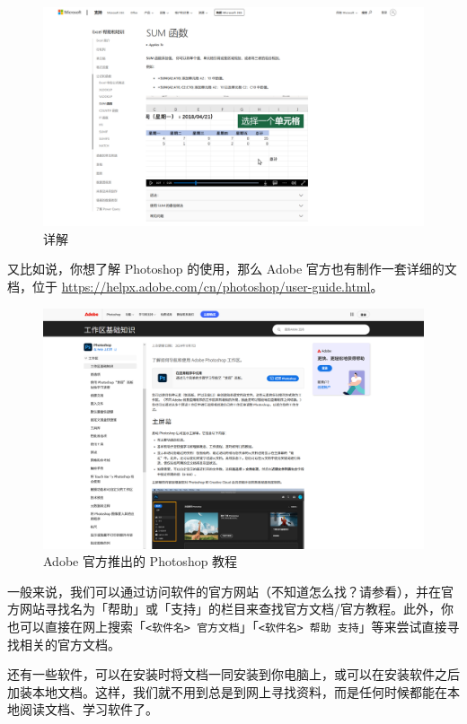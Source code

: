 \begin{figure}[htb!]
  \centering
  \includegraphics[width=.8\textwidth]{assets/software/MS_document_for_Excel_2.png}
  \caption{ 详解}
  \label{fig:MS_document_for_Excel_1}
\end{figure}

又比如说，你想了解 Photoshop 的使用，那么 Adobe 官方也有制作一套详细的文档，位于 \url{https://helpx.adobe.com/cn/photoshop/user-guide.html}。

\begin{figure}[htb!]
  \centering
  \includegraphics[width=.8\textwidth]{assets/software/Adobe_document_for_PS.png}
  \caption{Adobe 官方推出的 Photoshop 教程}
  \label{fig:Adobe_document_for_PS}
\end{figure}

一般来说，我们可以通过访问软件的官方网站（不知道怎么找？请参看），并在官方网站寻找名为「帮助」或「支持」的栏目来查找官方文档/官方教程。此外，你也可以直接在网上搜索「\texttt{<软件名>\ 官方文档}」「\texttt{<软件名>\ 帮助\ 支持}」等来尝试直接寻找相关的官方文档。

还有一些软件，可以在安装时将文档一同安装到你电脑上，或可以在安装软件之后加装本地文档。这样，我们就不用到总是到网上寻找资料，而是任何时候都能在本地阅读文档、学习软件了。

